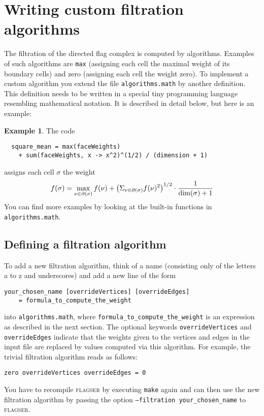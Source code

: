 \documentclass{amsart}
\theoremstyle{definition}
\newtheorem*{example*}{Example}
\let\originalleft\left
\let\originalright\right
\renewcommand{\left}{\mathopen{}\mathclose\bgroup\originalleft}
\renewcommand{\right}{\aftergroup\egroup\originalright}
\begin{document}
\section{Writing custom filtration algorithms}
The filtration of the directed flag complex is computed by algorithms.
Examples of such algorithms are \texttt{max} (assigning each cell the maximal weight of its
boundary cells) and zero (assigning each cell the weight zero).
To implement a custom algorithm you extend the file \texttt{algorithms.math} by another definition.
This definition needs to be written in a special tiny programming language resembling mathematical
notation.
It is described in detail below, but here is an example:

\begin{example*}
The code
\begin{verbatim}
  square_mean = max(faceWeights)
    + sum(faceWeights, x -> x^2)^(1/2) / (dimension + 1)
\end{verbatim}
assigns each cell $\sigma$ the weight
\[
  f(\sigma) = \max_{\nu\in\partial(\sigma)} f(\nu) +
  \left(\Sigma_{\nu\in\partial(\sigma)} f(\nu)^2\right)^{1/2}\cdot
  \frac{1}{\dim(\sigma) + 1}
\]
You can find more examples by looking at the built-in functions in \texttt{algorithms.math}.
\end{example*}

\subsection{Defining a filtration algorithm}
To add a new filtration algorithm, think of a name (consisting only of the letters a to z and
underscores) and add a new line of the form
\begin{verbatim}
your_chosen_name [overrideVertices] [overrideEdges]
    = formula_to_compute_the_weight
\end{verbatim}
into \texttt{algorithms.math}, where \texttt{formula\_to\_compute\_the\_weight} is an expression
as described in the next section.
The optional keywords \texttt{overrideVertices} and \texttt{overrideEdges} indicate that the
weights given to the vertices and edges in the input file are replaced by values computed
via this algorithm.
For example, the trivial filtration algorithm reads as follows:
\begin{verbatim}
zero overrideVertices overrideEdges = 0
\end{verbatim}
You have to recompile \textsc{flagser} by executing \texttt{make} again and can then use the new
filtration algorithm by passing the option \texttt{--filtration your\_chosen\_name} to
\textsc{flagser}.
\end{document}
